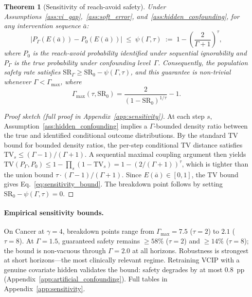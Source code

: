 \documentclass{article}
\newtheorem{theorem}{Theorem}
\newcommand{\TV}{\mathrm{TV}}
\newcommand{\ba}{\bar{a}}
\begin{document}
\begin{theorem}[Sensitivity of reach-avoid safety]
\label{thm:sensitivity}
Under Assumptions~\ref{ass:vi_gap},~\ref{ass:soft_error}, and~\ref{ass:hidden_confounding}, for any intervention sequence $\ba$:
\begin{equation}
\label{eq:sensitivity_bound}
|P_\Gamma(E(\ba)) - P_0(E(\ba))| \;\leq\; \psi(\Gamma, \tau) \;:=\; 1 - \left(\frac{2}{\Gamma + 1}\right)^{\!\tau},
\end{equation}
where $P_0$ is the reach-avoid probability identified under sequential ignorability and $P_\Gamma$ is the true probability under confounding level~$\Gamma$. Consequently, the population safety rate satisfies $\mathrm{SR}_\Gamma \geq \mathrm{SR}_0 - \psi(\Gamma, \tau)$, and this guarantee is non-trivial whenever $\Gamma < \Gamma_{\max}$, where
\begin{equation}
\label{eq:breakdown}
\Gamma_{\max}(\tau, \mathrm{SR}_0) = \frac{2}{(1 - \mathrm{SR}_0)^{1/\tau}} - 1.
\end{equation}
\end{theorem}

\begin{proof}[Proof sketch (full proof in Appendix~\ref{app:sensitivity})]
At each step $s$, Assumption~\ref{ass:hidden_confounding} implies a $\Gamma$-bounded density ratio between the true and identified conditional outcome distributions. By the standard TV bound for bounded density ratios, the per-step conditional TV distance satisfies $\TV_s \leq (\Gamma - 1)/(\Gamma + 1)$. A sequential maximal coupling argument then yields $\TV(P_\Gamma, P_0) \leq 1 - \prod_s (1 - \TV_s) = 1 - (2/(\Gamma+1))^\tau$, which is tighter than the union bound $\tau \cdot (\Gamma-1)/(\Gamma+1)$. Since $E(\ba) \in [0,1]$, the TV bound gives Eq.~\eqref{eq:sensitivity_bound}. The breakdown point follows by setting $\mathrm{SR}_0 - \psi(\Gamma, \tau) = 0$.
\end{proof}

\vspace{-0.8em}
\paragraph{Empirical sensitivity bounds.} On Cancer at $\gamma = 4$, breakdown points range from $\Gamma_{\max} = 7.5$ ($\tau = 2$) to $2.1$ ($\tau = 8$). At $\Gamma = 1.5$, guaranteed safety remains $\geq 58\%$ ($\tau = 2$) and $\geq 14\%$ ($\tau = 8$); the bound is non-vacuous through $\Gamma = 2.0$ at all horizons. Robustness is strongest at short horizons---the most clinically relevant regime. Retraining VCIP with a genuine covariate hidden validates the bound: safety degrades by at most 0.8~pp (Appendix~\ref{app:artificial_confounding}). Full tables in Appendix~\ref{app:sensitivity}.
\end{document}
